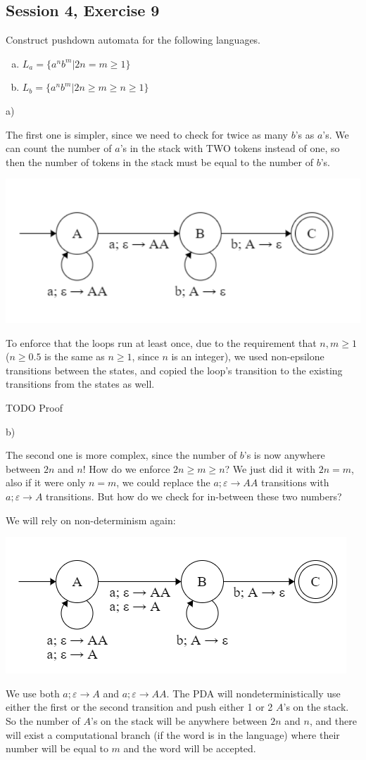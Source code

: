 \subsection{Session 4, Exercise 9}

\label{4_9}


Construct pushdown automata for the following languages.

\begin{enumerate}[a)]
\item $L_a = \{a^nb^m | 2n = m \geq{} 1\}$
\item $L_b = \{a^nb^m | 2n \geq{} m \geq{} n \geq{} 1\}$
\end{enumerate}


a)

The first one is simpler, since we need to check for twice as many $b$'s as $a$'s. We can count the number of $a$'s in the stack with TWO tokens instead of one, so then the number of tokens in the stack must be equal to the number of $b$'s.

\includegraphics[width=0.5\linewidth]{04/4_9_a.png}

To enforce that the loops run at least once, due to the requirement that $n,m\geq{}1$ ($n\geq{}0.5$ is the same as $n\geq{}1$, since $n$ is an integer), we used non-epsilone transitions between the states, and copied the loop's transition to the existing transitions from the states as well.

TODO Proof

b)

The second one is more complex, since the number of $b$'s is now anywhere between $2n$ and $n$! How do we enforce $2n \geq{} m \geq{} n$? We just did it with $2n = m$, also if it were only $n = m$, we could replace the $a; \varepsilon \rightarrow AA$ transitions with  $a; \varepsilon \rightarrow A$ transitions. But how do we check for in-between these two numbers?

We will rely on non-determinism again:

\includegraphics[width=0.5\linewidth]{04/4_9_b.png}

We use both $a; \varepsilon \rightarrow A$ and $a; \varepsilon \rightarrow AA$. The PDA will nondeterministically use either the first or the second transition and push either 1 or 2 $A$'s on the stack. So the number of $A$'s on the stack will be anywhere between $2n$ and $n$, and there will exist a computational branch (if the word is in the language) where their number will be equal to $m$ and the word will be accepted.